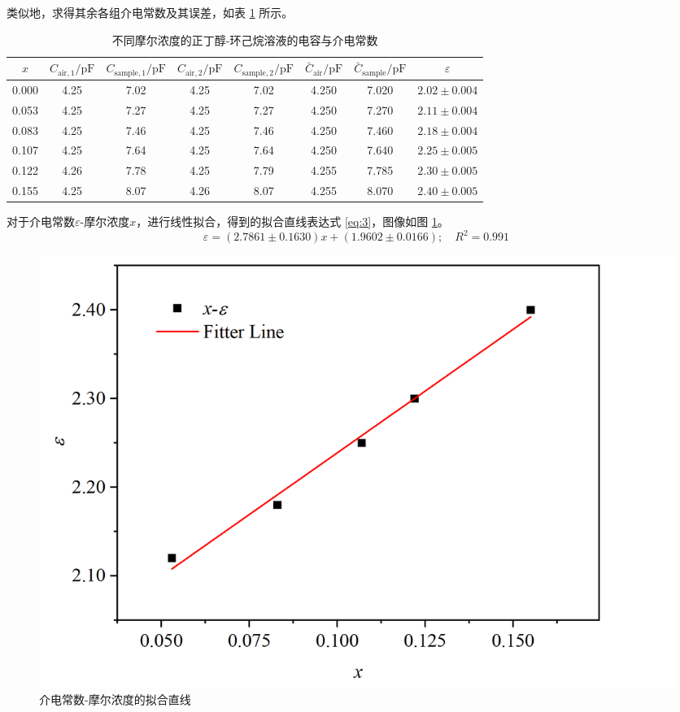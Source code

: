 \documentclass[cn,hazy,pku,12pt,normal,math=newtx,cite=super]{elegantnote}
\begin{document}
类似地，求得其余各组介电常数及其误差，如表 \ref{tab:2} 所示。

\begin{table}[htbp]
    \centering
    \caption{不同摩尔浓度的正丁醇-环己烷溶液的电容与介电常数}
    \begin{tabular}{cccccccc}
        \toprule
            $x$ & $C_{\text{air},1}/\mathrm{pF}$ & $C_{\text{sample},1}/\mathrm{pF}$ & $C_{\text{air},2}/\mathrm{pF}$ & $C_{\text{sample},2}/\mathrm{pF}$ & $\bar{C}_{\text{air}}/\mathrm{pF}$ & $\bar{C}_{\text{sample}}/\mathrm{pF}$ & $\varepsilon$ \\
        \midrule
            0.000 & 4.25 & 7.02 & 4.25 & 7.02 & 4.250 & 7.020 & $2.02 \pm 0.004$ \\
            0.053 & 4.25 & 7.27 & 4.25 & 7.27 & 4.250 & 7.270 & $2.11 \pm 0.004$ \\
            0.083 & 4.25 & 7.46 & 4.25 & 7.46 & 4.250 & 7.460 & $2.18 \pm 0.004$ \\
            0.107 & 4.25 & 7.64 & 4.25 & 7.64 & 4.250 & 7.640 & $2.25 \pm 0.005$ \\
            0.122 & 4.26 & 7.78 & 4.25 & 7.79 & 4.255 & 7.785 & $2.30 \pm 0.005$ \\
            0.155 & 4.25 & 8.07 & 4.26 & 8.07 & 4.255 & 8.070 & $2.40 \pm 0.005$ \\
        \bottomrule
    \end{tabular}
    \label{tab:2}
\end{table}

对于介电常数$\varepsilon$-摩尔浓度$x$，进行线性拟合，得到的拟合直线表达式 \eqref{eq:3}，图像如图 \ref{fig:2}。
\begin{equation}\label{eq:3}
    \varepsilon = (2.7861 \pm 0.1630) x + (1.9602 \pm 0.0166);\quad R^2 = 0.991
\end{equation}

\begin{figure}[htbp]
    \centering
    \includegraphics[width=.7\textwidth]{figures/1-1.png}
    \caption{介电常数-摩尔浓度的拟合直线}
    \label{fig:2}
\end{figure}
\end{document}
